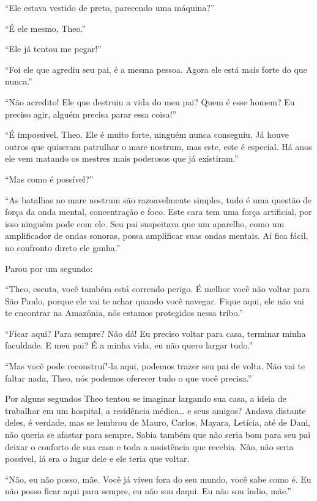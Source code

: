 ``Ele estava vestido de preto, parecendo uma máquina?''

``É ele mesmo, Theo.''

``Ele já tentou me pegar!''

``Foi ele que agrediu seu pai, é a mesma pessoa. Agora ele está mais
forte do que nunca.''

``Não acredito! Ele que destruiu a vida do meu pai? Quem é esse homem?
Eu preciso agir, alguém precisa parar essa coisa!''

``É impossível, Theo. Ele é muito forte, ninguém nunca conseguiu. Já
houve outros que quiseram patrulhar o mare nostrum, mas este, este é
especial. Há anos ele vem matando os mestres mais poderosos que já
existiram.''

``Mas como é possível?''

``As batalhas no mare nostrum são razoavelmente simples, tudo é uma
questão de força da onda mental, concentração e foco. Este cara tem uma
força artificial, por isso ninguém pode com ele. Seu pai suspeitava que
um aparelho, como um amplificador de ondas sonoras, possa amplificar suas ondas
mentais. Aí fica fácil, no confronto direto ele ganha.''

Parou por um segundo:

``Theo, escuta, você também está correndo perigo. É
melhor você não voltar para São Paulo, porque ele vai te achar quando
você navegar. Fique aqui, ele não vai te encontrar na Amazônia, nós
estamos protegidos nessa tribo.''

``Ficar aqui? Para sempre? Não dá! Eu preciso voltar para casa, terminar
minha faculdade. E meu pai? É a minha vida, eu não quero largar tudo.''

``Mas você pode reconstruí"-la aqui, podemos trazer seu pai de volta. Não
vai te faltar nada, Theo, nós podemos oferecer tudo o que você
precisa.''

Por alguns segundos Theo tentou se imaginar largando sua casa, a ideia de trabalhar
em um hospital, a residência médica\ldots{} e seus amigos? Andava distante
deles, é verdade, mas se lembrou de Mauro, Carlos, Mayara, Letícia, até
de Dani, não queria se afastar para sempre. Sabia também que não seria
bom para seu pai deixar o conforto de sua casa e toda a assistência que
recebia. Não, não seria possível, lá era o lugar dele e ele teria que
voltar.

``Não, eu não posso, mãe. Você já viveu fora do seu mundo, você sabe
como é. Eu não posso ficar aqui para sempre, eu não sou daqui. Eu não
sou índio, mãe.''

